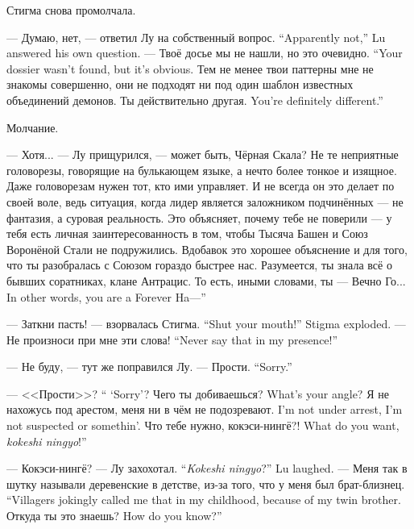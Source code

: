Стигма снова промолчала.

{--- Думаю, нет, --- ответил Лу на собственный вопрос.}
{``Apparently not,'' Lu answered his own question.}
{--- Твоё досье мы не нашли, но это очевидно.}
{``Your dossier wasn't found, but it's obvious.}
Тем не менее твои паттерны мне не знакомы совершенно, они не подходят ни под один шаблон известных объединений демонов.
{Ты действительно другая.}
{You're definitely different.''}

Молчание.

--- Хотя... --- Лу прищурился, --- может быть, Чёрная Скала?
Не те неприятные головорезы, говорящие на булькающем языке, а нечто более тонкое и изящное.
Даже головорезам нужен тот, кто ими управляет.
И не всегда он это делает по своей воле, ведь ситуация, когда лидер является заложником подчинённых --- не фантазия, а суровая реальность.
Это объясняет, почему тебе не поверили --- у тебя есть личная заинтересованность в том, чтобы Тысяча Башен и Союз Воронёной Стали не подружились.
Вдобавок это хорошее объяснение и для того, что ты разобралась с Союзом гораздо быстрее нас.
Разумеется, ты знала всё о бывших соратниках, клане Антрацис.
{То есть, иными словами, ты --- Вечно Го...}
{In other words, you are a Forever Ha---''}

{--- Заткни пасть! --- взорвалась Стигма.}
{``Shut your mouth!'' Stigma exploded.}
{--- Не произноси при мне эти слова!}
{``Never say that in my presence!''}

--- Не буду, --- тут же поправился Лу.
{--- Прости.}
{``Sorry.''}

{--- <<Прости>>?}
{`` `Sorry'?}
{Чего ты добиваешься?}
{What's your angle?}
{Я не нахожусь под арестом, меня ни в чём не подозревают.}
{I'm not under arrest, I'm not suspected or somethin'.}
{Что тебе нужно, кокэси-нингё\FM?!}
{What do you want, \textit{kokeshi ningyo}\FM!''}

{--- Кокэси-нингё? --- Лу захохотал.}
{``\textit{Kokeshi ningyo}?'' Lu laughed.}
{--- Меня так в шутку называли деревенские в детстве, из-за того, что у меня был брат-близнец.}
{``Villagers jokingly called me that in my childhood, because of my twin brother.}
{Откуда ты это знаешь?}
{How do you know?''}

